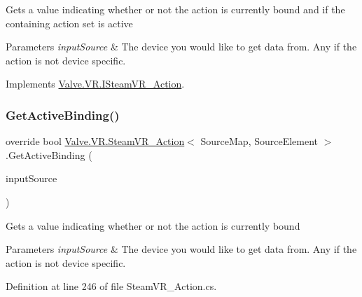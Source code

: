 Gets a value indicating whether or not the action is currently bound and if the containing action set is active 


\begin{DoxyParams}{Parameters}
{\em input\+Source} & The device you would like to get data from. Any if the action is not device specific.\\
\hline
\end{DoxyParams}


Implements \mbox{\hyperlink{interface_valve_1_1_v_r_1_1_i_steam_v_r___action_ad8d90df47697c9e5b43a0a46a241aa85}{Valve.\+V\+R.\+I\+Steam\+V\+R\+\_\+\+Action}}.

\mbox{\label{class_valve_1_1_v_r_1_1_steam_v_r___action_adb510f6f020a3023d6bbfa59110edf58}} 
\subsubsection{\texorpdfstring{GetActiveBinding()}{GetActiveBinding()}\hspace{0.1cm}{\footnotesize\ttfamily [1/2]}}
{\footnotesize\ttfamily override bool \mbox{\hyperlink{class_valve_1_1_v_r_1_1_steam_v_r___action}{Valve.\+V\+R.\+Steam\+V\+R\+\_\+\+Action}}$<$ Source\+Map, Source\+Element $>$.Get\+Active\+Binding (\begin{DoxyParamCaption}\item[{\mbox{\hyperlink{namespace_valve_1_1_v_r_a82e5bf501cc3aa155444ee3f0662853f}{Steam\+V\+R\+\_\+\+Input\+\_\+\+Sources}}}]{input\+Source }\end{DoxyParamCaption})}



Gets a value indicating whether or not the action is currently bound 


\begin{DoxyParams}{Parameters}
{\em input\+Source} & The device you would like to get data from. Any if the action is not device specific.\\
\hline
\end{DoxyParams}


Definition at line 246 of file Steam\+V\+R\+\_\+\+Action.\+cs.


